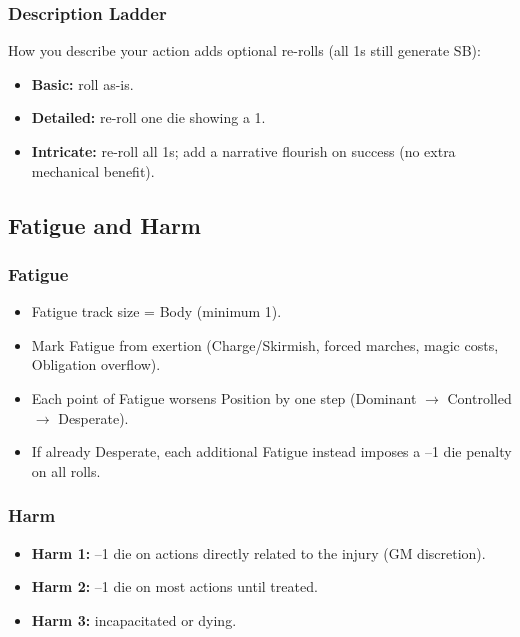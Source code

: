 \subsubsection{Description Ladder}
How you describe your action adds optional re-rolls (all 1s still generate SB):
\begin{itemize}
  \item \textbf{Basic:} roll as-is.
  \item \textbf{Detailed:} re-roll one die showing a 1.
  \item \textbf{Intricate:} re-roll all 1s; add a narrative flourish on success (no extra mechanical benefit).
\end{itemize}

\subsection{Fatigue and Harm}

\subsubsection{Fatigue}
\begin{itemize}
  \item Fatigue track size = Body (minimum 1).
  \item Mark Fatigue from exertion (Charge/Skirmish, forced marches, magic costs, Obligation overflow).
  \item Each point of Fatigue worsens Position by one step (Dominant $\rightarrow$ Controlled $\rightarrow$ Desperate).
  \item If already Desperate, each additional Fatigue instead imposes a –1 die penalty on all rolls.
\end{itemize}

\subsubsection{Harm}
\begin{itemize}
  \item \textbf{Harm 1:} –1 die on actions directly related to the injury (GM discretion).
  \item \textbf{Harm 2:} –1 die on most actions until treated.
  \item \textbf{Harm 3:} incapacitated or dying.
\end{itemize}

